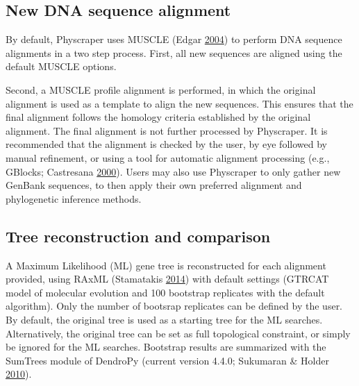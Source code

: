 \documentclass[]{article}
\begin{document}
\hypertarget{new-dna-sequence-alignment}{%
\subsection{New DNA sequence alignment}\label{new-dna-sequence-alignment}}

By default, Physcraper uses MUSCLE (Edgar \protect\hyperlink{ref-edgar2004muscle}{2004}) to perform DNA sequence alignments in a two step process. First, all new sequences are aligned using the default MUSCLE options.

Second, a MUSCLE profile alignment is performed, in which the original alignment is used as a template to align the new sequences. This ensures that the final alignment
follows the homology criteria established by the original alignment.
The final alignment is not further processed by Physcraper. It is recommended that the alignment is checked by the user, by eye followed by manual refinement, or using a tool for automatic alignment processing (e.g., GBlocks; Castresana \protect\hyperlink{ref-castresana2000selection}{2000}).
Users may also use Physcraper to only gather new GenBank sequences, to then apply their own preferred alignment and phylogenetic inference methods.

\hypertarget{tree-reconstruction-and-comparison}{%
\subsection{Tree reconstruction and comparison}\label{tree-reconstruction-and-comparison}}

A Maximum Likelihood (ML) gene tree is reconstructed for each alignment provided, using RAxML (Stamatakis \protect\hyperlink{ref-stamatakis2014raxml}{2014}) with default settings (GTRCAT model of molecular evolution and 100 bootstrap replicates with the default algorithm). Only the number of bootsrap replicates can be defined by the user.
By default, the original tree is used as a starting tree for the ML searches. Alternatively, the original tree can be set as full topological constraint, or simply be ignored for the ML searches.
Bootstrap results are summarized with the SumTrees module of DendroPy (current version 4.4.0; Sukumaran \& Holder \protect\hyperlink{ref-sukumaran2010dendropy}{2010}).
\end{document}
